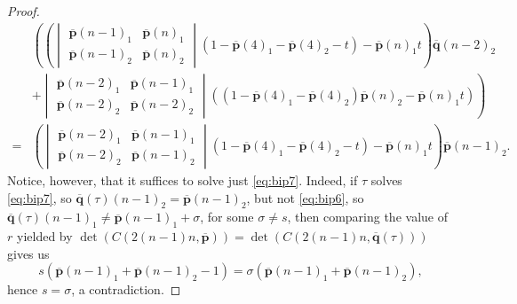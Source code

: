\documentclass[10pt,a4paper]{amsart}
\begin{document}
\begin{proof}
\begin{equation}
\begin{split}
        &\left(\left( \begin{vmatrix} \overline{\mathbf{p}}(n-1)_1 & \overline{\mathbf{p}}(n)_1 \\ \overline{\mathbf{p}}(n-1)_2 & \overline{\mathbf{p}}(n)_2 \end{vmatrix} (1-\overline{\mathbf{p}}(4)_1 - \overline{\mathbf{p}}(4)_2 -t) - \overline{\mathbf{p}}(n)_1t \right)\overline{\mathbf{q}}(n-2)_2\right.\\
        &+\left. \begin{vmatrix} \overline{\mathbf{p}}(n-2)_1 & \overline{\mathbf{p}}(n-1)_1 \\ \overline{\mathbf{p}}(n-2)_2 & \overline{\mathbf{p}}(n-2)_2 \end{vmatrix} ((1-\overline{\mathbf{p}}(4)_1-\overline{\mathbf{p}}(4)_2)\overline{\mathbf{p}}(n)_2 - \overline{\mathbf{p}}(n)_1t) \right) \\
        =& \left( \begin{vmatrix} \overline{\mathbf{p}}(n-2)_1 & \overline{\mathbf{p}}(n-1)_1 \\ \overline{\mathbf{p}}(n-2)_2 & \overline{\mathbf{p}}(n-1)_2 \end{vmatrix} (1-\overline{\mathbf{p}}(4)_1-\overline{\mathbf{p}}(4)_2-t) - \overline{\mathbf{p}}(n)_1t \right) \overline{\mathbf{p}}(n-1)_2.
    \end{split}
    \end{equation}
    Notice, however, that it suffices to solve just \cref{eq:bip7}.
    Indeed, if $\tau$ solves \cref{eq:bip7}, so $\overline{\mathbf{q}}(\tau)(n-1)_2=\overline{\mathbf{p}}(n-1)_2$, but not \cref{eq:bip6}, so $\overline{\mathbf{q}}(\tau)(n-1)_1\neq\overline{\mathbf{p}}(n-1)_1+\sigma$, for some $\sigma\neq s$, then comparing the value of $r$ yielded by $\det(C(2(n-1)n,\overline{\mathbf{p}}))=\det(C(2(n-1)n,\overline{\mathbf{q}}(\tau)))$ gives us
    \begin{equation*}
        s(\overline{\mathbf{p}}(n-1)_1+\overline{\mathbf{p}}(n-1)_2-1)=\sigma(\overline{\mathbf{p}}(n-1)_1+\overline{\mathbf{p}}(n-1)_2),
    \end{equation*}
    hence $s=\sigma$, a contradiction.


\end{proof}
\end{document}
